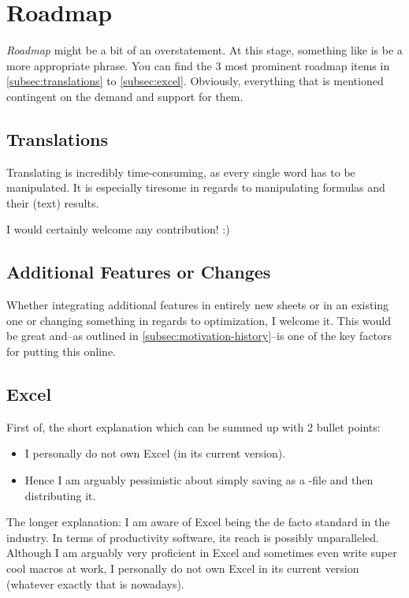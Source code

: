 \section{Roadmap}
\label{sec:roadmap}

\emph{Roadmap} might be a bit of an overstatement.
At this stage, something like  is be a more appropriate phrase.
You can find the 3 most prominent roadmap items in \autoref{subsec:translations} to \autoref{subsec:excel}.
Obviously, everything that is mentioned contingent on the demand and support for them.

\subsection{Translations}
\label{subsec:translations}

Translating \tfn is incredibly time-consuming, as every single word has to be manipulated.
It is especially tiresome in regards to manipulating formulas and their (text) results.

I would certainly welcome any contribution! :)

\subsection{Additional Features or Changes}
\label{subsec:additional-features}

Whether integrating additional features in entirely new sheets or in an existing one or changing something in regards to optimization, I welcome it.
This would be great and--as outlined in \autoref{subsec:motivation-history}--is one of the key factors for putting this online.

\subsection{Excel}
\label{subsec:excel}

First of, the short explanation which can be summed up with 2 bullet points:
\begin{itemize}
	\item I personally do not own Excel (in its current version).
	\item Hence I am arguably pessimistic about simply saving \tfn as a -file and then distributing it.
\end{itemize}

The longer explanation:
I am aware of Excel being the de facto standard in the industry.
In terms of productivity software, its reach is possibly unparalleled.
Although I am arguably very proficient in Excel and sometimes even write super cool macros at work, I personally do not own Excel in its current version (whatever exactly that is nowadays).

